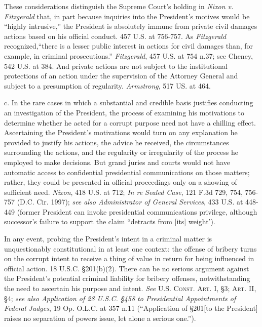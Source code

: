 These considerations distinguish the Supreme Court’s holding in \textit{Nixon v. Fitzgerald} that, in part because inquiries into the President’s motives would be “highly intrusive,” the President is absolutely immune from private civil damages actions based on his official conduct. 457 U.S. at 756-757.
As \textit{Fitzgerald} recognized,“there is a lesser public interest in actions for civil damages than, for example, in criminal prosecutions.”
\textit{Fitzgerald}, 457 U.S. at 754 n.37; see Cheney, 542 U.S. at 384.
And private actions are not subject to the institutional protections of an action under the supervision of the Attorney General and subject to a presumption of regularity.
\textit{Armstrong}, 517 US. at 464.

c. In the rare cases in which a substantial and credible basis justifies conducting an investigation of the President, the process of examining his motivations to determine whether he acted for a corrupt purpose need not have a chilling effect.
Ascertaining the President’s motivations would turn on any explanation he provided to justify his actions, the advice he received, the circumstances surrounding the actions, and the regularity or irregularity of the process he employed to make decisions.
But grand juries and courts would not have automatic access to confidential presidential communications on those matters; rather, they could be presented in official proceedings only on a showing of sufficient need.
\textit{Nixon}, 418 U.S. at 712;
\textit{In re Sealed Case}, 121 F.3d 729, 754, 756-757 (D.C. Cir. 1997);
\textit{see also Administrator of General Services}, 433 U.S. at 448-449 (former President can invoke presidential communications privilege, although successor’s failure to support the claim “detracts from [its] weight’).

In any event, probing the President’s intent in a criminal matter is unquestionably constitutional in at least one context: the offense of bribery turns on the corrupt intent to receive a thing of value in return for being influenced in official action.
18 U.S.C. \S 201(b)(2).
There can be no serious argument against the President’s potential criminal liability for bribery offenses, notwithstanding the need to ascertain his purpose and intent.
\textit{See} \textsc{U.S. Const. Art. I}, \S 3; \textsc{Art. II}, \S 4;
\textit{see also Application of 28 U.S.C. \S 458 to Presidential Appointments of Federal Judges}, 19 Op. O.L.C. at 357 n.11 (“Application of \S 201[to the President] raises no separation of powers issue, let alone a serious one.”).

